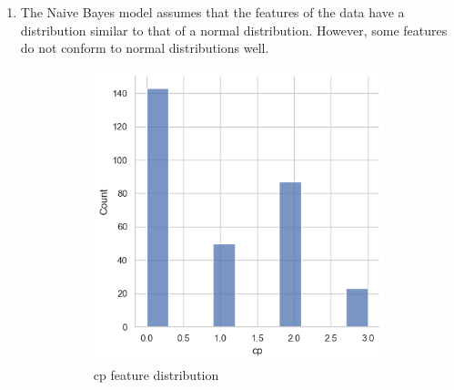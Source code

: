 \documentclass{article}
\begin{document}
\begin{enumerate}[leftmargin=\labelsep]
\begin{enumerate}
\end{enumerate}
\newpage
\item
The Naive Bayes model assumes that the features of the data have a distribution similar to that of a normal distribution.
However, some features do not conform to normal distributions well.


\begin{figure}[H]
    \centering
    \begin{subfigure}{0.3\linewidth}
        \centering
        \includegraphics[width=\linewidth]{img/cp_distrib.png}
        \caption{cp feature distribution}
        \label{fig:cp}
    \end{subfigure}
    \hfill %
    \begin{subfigure}{0.3\linewidth}
        \centering

\end{subfigure}
\end{figure}
\end{enumerate}
\end{document}
